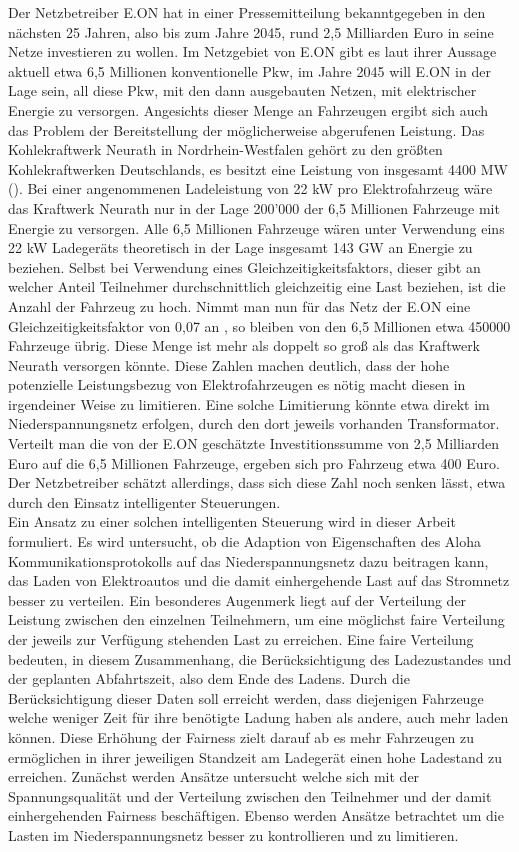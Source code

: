 Der Netzbetreiber E.ON hat in einer Pressemitteilung \cite{eon_presse} bekanntgegeben in den nächsten 25 Jahren, also bis zum Jahre 2045, rund 2,5 Milliarden Euro in seine Netze investieren zu wollen. Im Netzgebiet von E.ON gibt es laut ihrer Aussage aktuell etwa 6,5 Millionen konventionelle Pkw, im Jahre 2045 will E.ON in der Lage sein, all diese Pkw, mit den dann ausgebauten Netzen, mit elektrischer Energie zu versorgen. Angesichts dieser Menge an Fahrzeugen ergibt sich auch das Problem der Bereitstellung der möglicherweise abgerufenen Leistung. Das Kohlekraftwerk Neurath in Nordrhein-Westfalen gehört zu den größten Kohlekraftwerken Deutschlands, es besitzt eine Leistung von insgesamt 4400 MW (\cite{power}). Bei einer angenommenen Ladeleistung von 22 kW pro Elektrofahrzeug wäre das Kraftwerk Neurath nur in der Lage 200'000 der 6,5 Millionen Fahrzeuge mit Energie zu versorgen. Alle 6,5 Millionen Fahrzeuge wären unter Verwendung eins 22 kW Ladegeräts theoretisch in der Lage insgesamt 143 GW an Energie zu beziehen. 
Selbst bei Verwendung eines Gleichzeitigkeitsfaktors, dieser gibt an welcher Anteil Teilnehmer durchschnittlich gleichzeitig eine Last beziehen, ist die Anzahl der Fahrzeug zu hoch. Nimmt man nun für das Netz der E.ON eine Gleichzeitigkeitsfaktor von 0,07 an \cite{gust_2014}, so bleiben von den 6,5 Millionen etwa 450000 Fahrzeuge übrig. Diese Menge ist mehr als doppelt so groß als das Kraftwerk Neurath versorgen könnte. Diese Zahlen machen deutlich, dass der hohe potenzielle Leistungsbezug von Elektrofahrzeugen es nötig macht diesen in irgendeiner Weise zu limitieren. Eine solche Limitierung könnte etwa direkt im Niederspannungsnetz erfolgen, durch den dort jeweils vorhanden Transformator. Verteilt man die von der E.ON geschätzte Investitionssumme von 2,5 Milliarden Euro auf die 6,5 Millionen Fahrzeuge, ergeben sich pro Fahrzeug etwa 400 Euro. Der Netzbetreiber schätzt allerdings, dass sich diese Zahl noch senken lässt, etwa durch den Einsatz intelligenter Steuerungen. \\
Ein Ansatz zu einer solchen intelligenten Steuerung wird in dieser Arbeit formuliert. Es wird untersucht, ob die Adaption von Eigenschaften des Aloha Kommunikationsprotokolls auf das Niederspannungsnetz dazu beitragen kann, das Laden von Elektroautos und die damit einhergehende Last auf das Stromnetz besser zu verteilen. Ein besonderes Augenmerk liegt auf der Verteilung der Leistung zwischen den einzelnen Teilnehmern, um eine möglichst faire Verteilung der jeweils zur Verfügung stehenden Last zu erreichen. Eine faire Verteilung bedeuten, in diesem Zusammenhang, die Berücksichtigung des Ladezustandes und der geplanten Abfahrtszeit, also dem Ende des Ladens. Durch die Berücksichtigung dieser Daten soll erreicht werden, dass diejenigen Fahrzeuge welche weniger Zeit für ihre benötigte Ladung haben als andere, auch mehr laden können. Diese Erhöhung der Fairness zielt darauf ab es mehr Fahrzeugen zu ermöglichen in ihrer jeweiligen Standzeit am Ladegerät einen hohe Ladestand zu erreichen. Zunächst werden Ansätze untersucht welche sich mit der Spannungsqualität und der Verteilung zwischen den Teilnehmer und der damit einhergehenden Fairness beschäftigen. Ebenso werden Ansätze betrachtet um die Lasten im Niederspannungsnetz besser zu kontrollieren und zu limitieren.